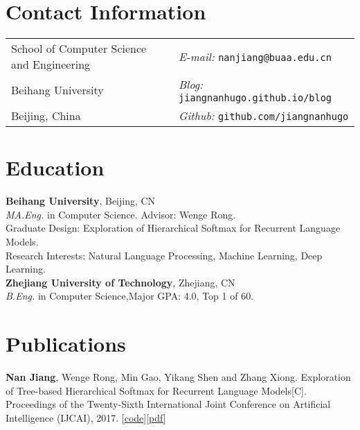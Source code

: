 \documentclass[margin,line]{resume}
\begin{document}

\begin{resume}
\section{Contact Information}
\begin{tabular}{@{}p{3in}p{3in}}
School of Computer Science and Engineering & {\it E-mail:}  {\tt nanjiang@buaa.edu.cn} \\
Beihang University                         & {\it Blog:} {\tt jiangnanhugo.github.io/blog} \\
Beijing, China                             & {\it Github:} {\tt github.com/jiangnanhugo} \\
\end{tabular}


\section{Education}
{\bf Beihang University}, Beijing,  CN\\
\emph{MA.Eng.} in Computer Science. Advisor: Wenge Rong.\\
Graduate Design: Exploration of Hierarchical Softmax for Recurrent Language Models. \\
Research Interests: Natural Language Processing, Machine Learning, Deep Learning. \\

{\bf Zhejiang University of Technology}, Zhejiang, CN\\
\emph{B.Eng.} in Computer Science,\space Major GPA: 4.0, Top 1 of 60.


\section{Publications}

\textbf{Nan Jiang}, Wenge Rong, Min Gao, Yikang Shen and Zhang Xiong. Exploration of Tree-based Hierarchical Softmax for Recurrent Language Models[C]. Proceedings of the Twenty-Sixth International Joint Conference on Artificial Intelligence (IJCAI), 2017. [\href{https://github.com/jiangnanHugo/lmkit}{code}][\href{https://www.ijcai.org/proceedings/2017/0271.pdf}{pdf}]


\end{resume}
\end{document}
